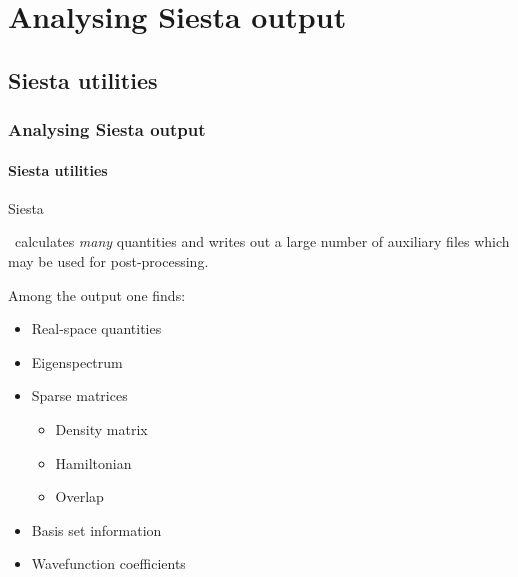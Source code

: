 
\section{Analysing Siesta output}



\subsection{Siesta utilities}

\begin{frame}
  \frametitle{Analysing Siesta output}
  \framesubtitle{Siesta utilities}

  \begin{block}{Siesta}

    \siesta\ calculates \emph{many} quantities and writes out a large number of auxiliary
    files which may be used for post-processing.

    Among the output one finds:
    \begin{itemize}
      \item Real-space quantities
      \item Eigenspectrum
      \item Sparse matrices
      \begin{itemize}
        \item Density matrix
        \item Hamiltonian
        \item Overlap
      \end{itemize}
      \item Basis set information
      \item Wavefunction coefficients
    \end{itemize}
    
  \end{block}
  
\end{frame}


